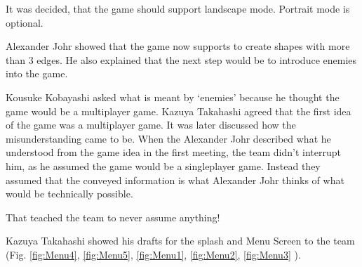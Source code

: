 It was decided, that the game should support landscape mode. Portrait mode is optional.

Alexander Johr showed that the game now supports to create shapes with more than 3 edges. He also explained that the next step would be to introduce enemies into the game.

Kousuke Kobayashi asked what is meant by ‘enemies’ because he thought the game would be a multiplayer game. Kazuya Takahashi agreed that the first idea of the game was a multiplayer game. It was later discussed how the misunderstanding came to be. When the Alexander Johr described what he understood from the game idea in the first meeting, the team didn’t interrupt him, as he assumed the game would be a singleplayer game. Instead they assumed that the conveyed information is what Alexander Johr thinks of what would be technically possible.

That teached the team to never assume anything!

Kazuya Takahashi showed his drafts for the splash and Menu Screen to the team (Fig. \ref{fig:Menu4}, \ref{fig:Menu5}, \ref{fig:Menu1}, \ref{fig:Menu2}, \ref{fig:Menu3} ).

